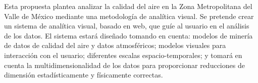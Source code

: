 Esta propuesta plantea analizar la calidad del aire en la Zona Metropolitana del Valle de México mediante una metodología de analítica visual. Se pretende crear un sistema de analítica visual, basado en web, que guíe al usuario en el análisis de los datos. El sistema estará diseñado tomando en cuenta: modelos de minería de datos de calidad del aire y datos atmosféricos; modelos visuales para interacción con el usuario; diferentes escalas espacio-temporales; y tomará en cuenta la multidimensionalidad de los datos para proporcionar reducciones de dimensión estadísticamente y físicamente correctas.